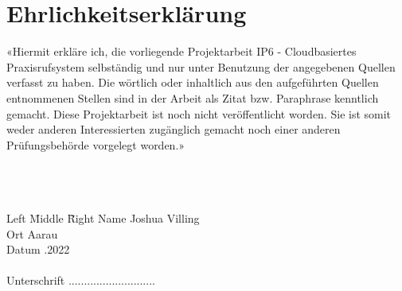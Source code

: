 \section{Ehrlichkeitserklärung}

«Hiermit erkläre ich, die vorliegende Projektarbeit IP6 - Cloudbasiertes Praxisrufsystem selbständig und nur unter Benutzung der angegebenen Quellen verfasst zu haben.
Die wörtlich oder inhaltlich aus den aufgeführten Quellen entnommenen Stellen sind in der Arbeit als Zitat bzw. Paraphrase kenntlich gemacht.
Diese Projektarbeit ist noch nicht veröffentlicht worden.
Sie ist somit weder anderen Interessierten zugänglich gemacht noch einer anderen Prüfungsbehörde vorgelegt worden.»

\begin{tabbing}
    \\
    \\
    \\
    Left \= Middle \=  \= Right \kill
    Name \> \> \>    Joshua Villing\\
    Ort \> \> \>    Aarau \\
    Datum \> \> .2022\\
    \\
    Unterschrift \> \> \>     ............................\\

\end{tabbing}
